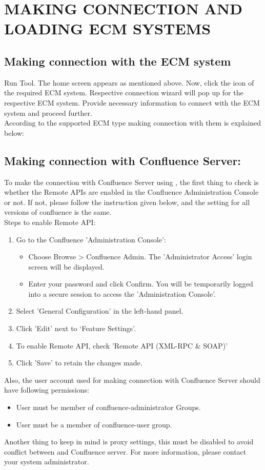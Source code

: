 \section{MAKING CONNECTION AND LOADING ECM SYSTEMS}
\subsection{Making connection with the ECM system}
Run \appName Tool. The home screen appears as mentioned above. Now, click the icon of the required ECM system. Respective connection wizard will pop up for the respective ECM system. Provide necessary information to connect with the ECM system and proceed further.\\
According to the supported ECM type making connection with them is explained below:
\subsection*{Making connection with Confluence Server:}
To make the connection with Confluence Server using \appName, the first thing to check is whether the Remote APIs are enabled in the Confluence Administration Console or not. If not, please follow the instruction given below, and the setting for all versions of confluence is the same.\\
Steps to enable Remote API:
\begin{enumerate}
	\item Go to the Confluence 'Administration Console':
	\begin{itemize}
		\item Choose Browse > Confluence Admin. The 'Administrator Access' login screen will be displayed.
		\item Enter your password and click Confirm. You will be temporarily logged into a secure session to access the 'Administration Console'.		
	\end{itemize}
	\item Select 'General Configuration' in the left-hand panel.
	\item Click 'Edit' next to ‘Feature Settings’.
	\item To enable Remote API, check 'Remote API (XML-RPC \& SOAP)'
	\item Click 'Save' to retain the changes made.
\end{enumerate}
	Also, the user account used for making connection with Confluence Server should have following permissions:
	\begin{itemize}
		\item User must be member of confluence-administrator Groups.
		\item User must be a member of confluence-user group.
	\end{itemize}
Another thing to keep in mind is proxy settings, this must be disabled to avoid conflict between \appName and Confluence server. For more information, please contact your system administrator.
